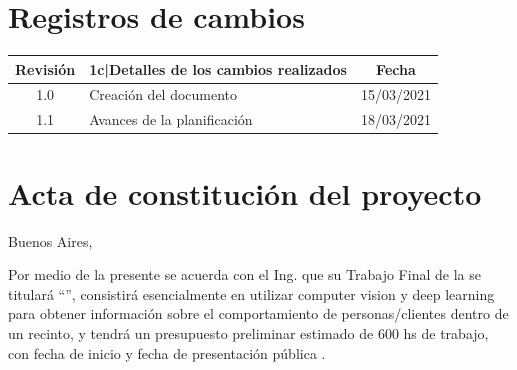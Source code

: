 \documentclass[11pt]{charter}
\begin{document}
\maketitle
\thispagestyle{empty}
\pagebreak


\thispagestyle{empty}
{\setlength{\parskip}{0pt}
\tableofcontents{}
}
\pagebreak


\section{Registros de cambios}
\label{sec:registro}


\begin{table}[ht]
\label{tab:registro}
\centering
\begin{tabularx}{\linewidth}{@{}|c|X|c|@{}}
\hline
\rowcolor[HTML]{C0C0C0} 
Revisión & {1}{c|}{\cellcolor[HTML]{C0C0C0}Detalles de los cambios realizados} & Fecha      \\ \hline
1.0      & Creación del documento                                          & 15/03/2021 \\ \hline
1.1      & Avances de la planificación & 18/03/2021 \\ \hline
\end{tabularx}
\end{table}

\pagebreak



\section{Acta de constitución del proyecto}
\label{sec:acta}

\begin{flushright}
Buenos Aires, \fechaInicioName
\end{flushright}

\vspace{2cm}

Por medio de la presente se acuerda con el Ing. \authorname\hspace{1px} que su Trabajo Final de la \degreename\hspace{1px} se titulará ``\ttitle'', consistirá esencialmente en utilizar computer vision y deep learning para obtener información sobre el comportamiento de personas/clientes dentro de un recinto, y tendrá un presupuesto preliminar estimado de 600 hs de trabajo, con fecha de inicio \fechaInicioName\hspace{1px} y fecha de presentación pública \fechaFinalName.
\end{document}
